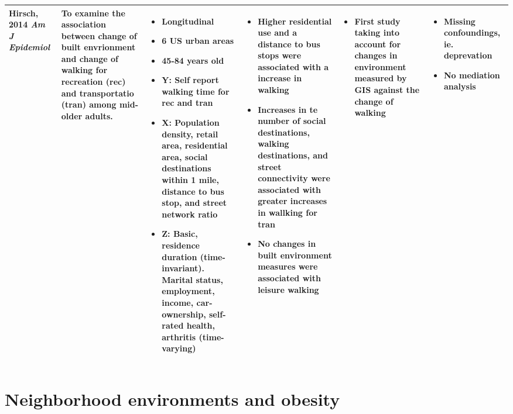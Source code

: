 \documentclass{article}
\begin{document}
\begin{longtable}[ht!]{ m{2cm} m{4cm} m{6cm} m{5cm} m{4cm} m{3cm} }
	Hirsch, 2014 \textit{Am J Epidemiol} &
	To examine the association between change of built envrionment and change of walking for recreation (rec) and transportatio (tran) among mid-older adults. &
	\begin{itemize}[noitemsep,topsep=0pt] \item Longitudinal \item 6 US urban areas \item 45-84 years old \item Y: Self report walking time for rec and tran \item X: Population density, retail area, residential area, social destinations within 1 mile, distance to bus stop, and street network ratio \item Z: Basic, residence duration (time-invariant). Marital status, employment, income, car-ownership, self-rated health, arthritis (time-varying) 
	\end{itemize} &
	\begin{itemize}[noitemsep,topsep=0pt] \item Higher residential use and a distance to bus stops were associated with a increase in walking \item Increases in te number of social destinations, walking destinations, and street connectivity were associated with greater increases in wallking for tran \item No changes in built environment measures were associated with leisure walking
	\end{itemize} &
	\begin{itemize}[noitemsep,topsep=0pt] \item First study taking into account for changes in environment measured by GIS against the change of walking
	\end{itemize} &
	\begin{itemize}[noitemsep,topsep=0pt] \item Missing confoundings, ie. deprevation \item No mediation analysis
	\end{itemize} \\
	\hline

\end{longtable}


\newpage
\section{Neighborhood environments and obesity}
\end{document}
